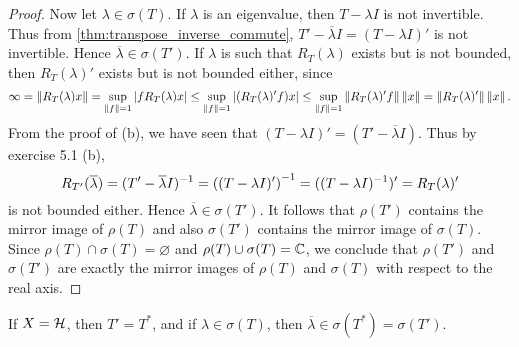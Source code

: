 \begin{proof}
    Now let $\lambda\in\sigma(T)$. If $\lambda$ is an eigenvalue, then 
    $T-\lambda I$ is not invertible. Thus from \cref{thm:transpose_inverse_commute}, 
    $T' - \overline{\lambda}I = (T-\lambda I)'$ is not invertible. 
    Hence $\overline{\lambda}\in\sigma(T')$. If $\lambda$ is such that 
    $R_T(\lambda)$ exists but is not bounded, then $R_T(\lambda)'$ exists 
    but is not bounded either, since 
    \begin{equation*}
        \infty = \left\lVert {R_T(\lambda)x} \right\rVert = \sup_{\left\lVert {f} \right\rVert=1}\left\lvert {fR_T(\lambda)x} \right\rvert 
        \leq \sup_{\left\lVert {f} \right\rVert=1} \left\lvert {(R_T(\lambda)'f)x} \right\rvert 
        \leq \sup_{\left\lVert {f} \right\rVert=1}\left\lVert {R_T(\lambda)'f} \right\rVert\left\lVert {x} \right\rVert 
        = \left\lVert {R_T(\lambda)'} \right\rVert\left\lVert {x} \right\rVert.
    \end{equation*}
    From the proof of (b), we have seen that $(T-\lambda I)' = (T'-\overline{\lambda}I)$. 
    Thus by exercise 5.1 (b), 
    \begin{equation*}
        R_{T'}(\overline{\lambda}) = (T'-\overline{\lambda}I)^{-1} 
        = \pth{(T-\lambda I)'}^{-1} = ((T-\lambda I)^{-1})' = R_T(\lambda)'
    \end{equation*}
    is not bounded either. Hence $\overline{\lambda}\in\sigma(T')$. 
    It follows that $\rho(T')$ contains the mirror image of $\rho(T)$ 
    and also $\sigma(T')$ contains the mirror image of $\sigma(T)$. Since 
    $\rho(T)\cap\sigma(T) = \varnothing$ and $\rho(T)\cup\sigma(T) = \mathbb{C}$, 
    we conclude that $\rho(T')$ and $\sigma(T')$ are exactly the mirror 
    images of $\rho(T)$ and $\sigma(T)$ with respect to the real axis.
\end{proof}
\begin{remark}
    If $X = \mathcal{H}$, then $T' = T^*$, and if $\lambda\in\sigma(T)$, 
    then $\overline{\lambda}\in\sigma(T^*) = \sigma(T')$.
\end{remark}

